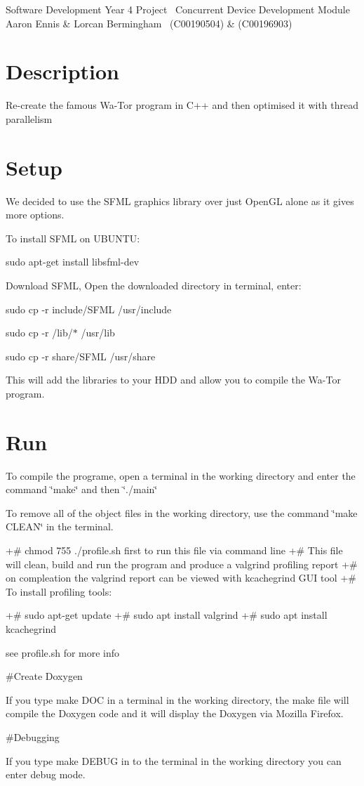 Software Development Year 4 Project~\newline
 Concurrent Device Development Module~\newline
 Aaron Ennis \& Lorcan Bermingham~\newline
 (C00190504) \& (C00196903)

\section*{Description}

Re-\/create the famous Wa-\/\+Tor program in C++ and then optimised it with thread parallelism

\section*{Setup}

We decided to use the S\+F\+ML graphics library over just Open\+GL alone as it gives more options.

To install S\+F\+ML on U\+B\+U\+N\+TU\+:

sudo apt-\/get install libsfml-\/dev

Download S\+F\+ML, Open the downloaded directory in terminal, enter\+:

sudo cp -\/r include/\+S\+F\+ML /usr/include

sudo cp -\/r /lib/$\ast$ /usr/lib

sudo cp -\/r share/\+S\+F\+ML /usr/share

This will add the libraries to your H\+DD and allow you to compile the Wa-\/\+Tor program.

\section*{Run}

To compile the programe, open a terminal in the working directory and enter the command \char`\"{}make\char`\"{} and then \char`\"{}./main\char`\"{}

To remove all of the object files in the working directory, use the command \char`\"{}make C\+L\+E\+A\+N\char`\"{} in the terminal.

+\# chmod 755 ./profile.sh first to run this file via command line +\# This file will clean, build and run the program and produce a valgrind profiling report +\# on compleation the valgrind report can be viewed with kcachegrind G\+UI tool +\# To install profiling tools\+:
\begin{DoxyItemize}
\item +\# sudo apt-\/get update +\# sudo apt install valgrind +\# sudo apt install kcachegrind
\end{DoxyItemize}

see profile.\+sh for more info

\#\+Create Doxygen

If you type \textquotesingle{}make D\+OC\textquotesingle{} in a terminal in the working directory, the make file will compile the Doxygen code and it will display the Doxygen via Mozilla Firefox.

\#\+Debugging

If you type \textquotesingle{}make D\+E\+B\+UG\textquotesingle{} in to the terminal in the working directory you can enter debug mode. 